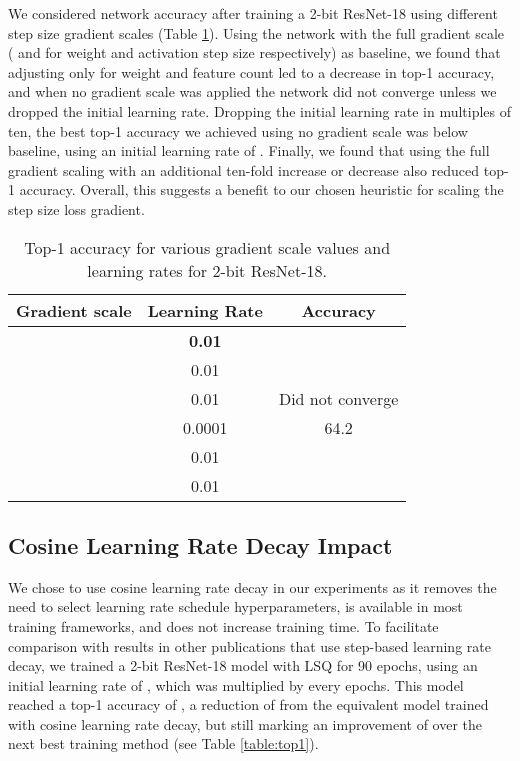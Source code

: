\documentclass{article}
\begin{document}
We considered network accuracy after training a 2-bit ResNet-18 using different step size gradient scales (Table \ref{table:gscale}).
Using the network with the full gradient scale ( and  for weight and activation step size respectively) as baseline, we found that adjusting only for weight and feature count led to a  decrease in top-1 accuracy, and when no gradient scale was applied the network did not converge unless we dropped the initial learning rate.
Dropping the initial learning rate in multiples of ten, the best top-1 accuracy we achieved using no gradient scale was  below baseline, using an initial learning rate of .
Finally, we found that using the full gradient scaling with an additional ten-fold increase or decrease also reduced top-1 accuracy.
Overall, this suggests a benefit to our chosen heuristic for scaling the step size loss gradient.


\begin{table}[h]
	\caption{Top-1 accuracy for various gradient scale values and learning rates for 2-bit ResNet-18.}
	\label{table:gscale}
	\setlength\tabcolsep{6pt}
\begin{center}
	\begin{small}
\begin{tabular}{l c c}
    		\toprule
		Gradient scale 		& Learning Rate 	& Accuracy \\
		\midrule
			& \bf{0.01}		& 	\\ 
		\midrule		
				& 0.01		& 		\\
						& 0.01		&  Did not converge \\
						& 0.0001		&  64.2 \\
		\midrule		 	
				& 0.01		& 		\\ 	
		 	& 0.01		& 		\\
		\bottomrule
	\end{tabular}
\end{small}
	\end{center}
\end{table}


\subsection{Cosine Learning Rate Decay Impact}

We chose to use cosine learning rate decay in our experiments as it removes the need to select learning rate schedule hyperparameters, is available in most training frameworks, and does not increase training time.
To facilitate comparison with results in other publications that use step-based learning rate decay, we trained a 2-bit ResNet-18 model with LSQ for 90 epochs, using an initial learning rate of , which was multiplied by  every  epochs.
This model reached a top-1 accuracy of , a reduction of  from the equivalent model trained with cosine learning rate decay, but still marking an improvement of  over the next best training method (see Table \ref{table:top1}).
\end{document}
